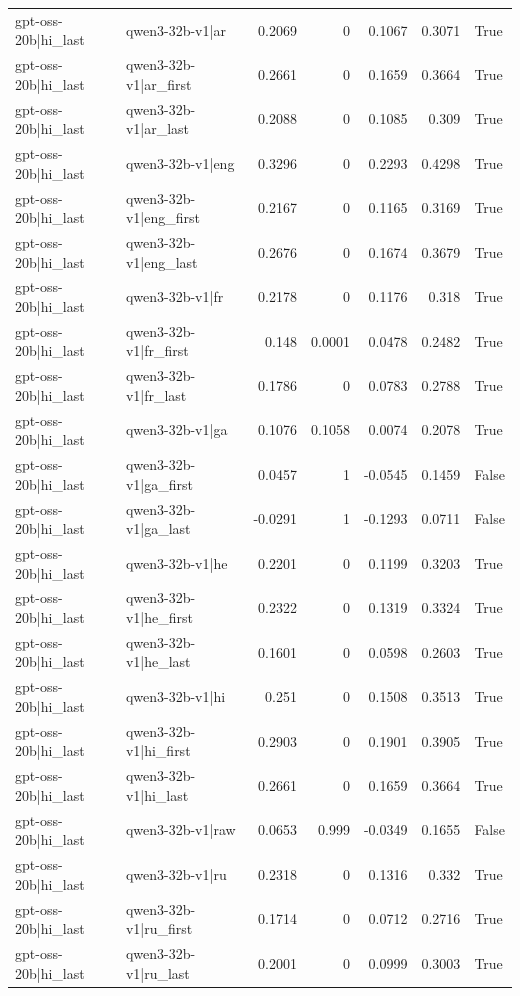 \begin{table}
\begin{tabular}{l l r r r r l}
gpt-oss-20b|hi_last & qwen3-32b-v1|ar & 0.2069 & 0 & 0.1067 & 0.3071 & True \\
gpt-oss-20b|hi_last & qwen3-32b-v1|ar_first & 0.2661 & 0 & 0.1659 & 0.3664 & True \\
gpt-oss-20b|hi_last & qwen3-32b-v1|ar_last & 0.2088 & 0 & 0.1085 & 0.309 & True \\
gpt-oss-20b|hi_last & qwen3-32b-v1|eng & 0.3296 & 0 & 0.2293 & 0.4298 & True \\
gpt-oss-20b|hi_last & qwen3-32b-v1|eng_first & 0.2167 & 0 & 0.1165 & 0.3169 & True \\
gpt-oss-20b|hi_last & qwen3-32b-v1|eng_last & 0.2676 & 0 & 0.1674 & 0.3679 & True \\
gpt-oss-20b|hi_last & qwen3-32b-v1|fr & 0.2178 & 0 & 0.1176 & 0.318 & True \\
gpt-oss-20b|hi_last & qwen3-32b-v1|fr_first & 0.148 & 0.0001 & 0.0478 & 0.2482 & True \\
gpt-oss-20b|hi_last & qwen3-32b-v1|fr_last & 0.1786 & 0 & 0.0783 & 0.2788 & True \\
gpt-oss-20b|hi_last & qwen3-32b-v1|ga & 0.1076 & 0.1058 & 0.0074 & 0.2078 & True \\
gpt-oss-20b|hi_last & qwen3-32b-v1|ga_first & 0.0457 & 1 & -0.0545 & 0.1459 & False \\
gpt-oss-20b|hi_last & qwen3-32b-v1|ga_last & -0.0291 & 1 & -0.1293 & 0.0711 & False \\
gpt-oss-20b|hi_last & qwen3-32b-v1|he & 0.2201 & 0 & 0.1199 & 0.3203 & True \\
gpt-oss-20b|hi_last & qwen3-32b-v1|he_first & 0.2322 & 0 & 0.1319 & 0.3324 & True \\
gpt-oss-20b|hi_last & qwen3-32b-v1|he_last & 0.1601 & 0 & 0.0598 & 0.2603 & True \\
gpt-oss-20b|hi_last & qwen3-32b-v1|hi & 0.251 & 0 & 0.1508 & 0.3513 & True \\
gpt-oss-20b|hi_last & qwen3-32b-v1|hi_first & 0.2903 & 0 & 0.1901 & 0.3905 & True \\
gpt-oss-20b|hi_last & qwen3-32b-v1|hi_last & 0.2661 & 0 & 0.1659 & 0.3664 & True \\
gpt-oss-20b|hi_last & qwen3-32b-v1|raw & 0.0653 & 0.999 & -0.0349 & 0.1655 & False \\
gpt-oss-20b|hi_last & qwen3-32b-v1|ru & 0.2318 & 0 & 0.1316 & 0.332 & True \\
gpt-oss-20b|hi_last & qwen3-32b-v1|ru_first & 0.1714 & 0 & 0.0712 & 0.2716 & True \\
gpt-oss-20b|hi_last & qwen3-32b-v1|ru_last & 0.2001 & 0 & 0.0999 & 0.3003 & True \\

\end{tabular}
\end{table}
